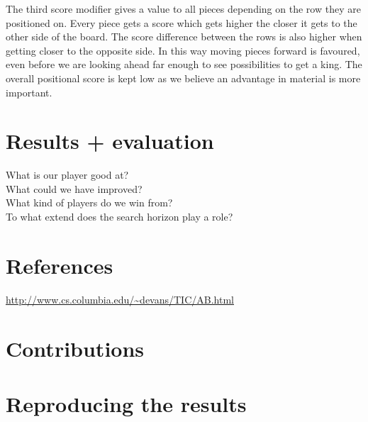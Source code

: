 \documentclass[11pt,a4paper]{article}
\begin{document}
The third score modifier gives a value to all pieces depending on the row they are positioned on. Every piece gets a score which gets higher the closer it gets to the other side of the board. The score difference between the rows is also higher when getting closer to the opposite side. In this way moving pieces forward is favoured, even before we are looking ahead far enough to see possibilities to get a king. The overall positional score is kept low as we believe an advantage in material is more important.

\section{Results + evaluation}
What is our player good at?\\
What could we have improved?\\
What kind of players do we win from?\\
To what extend does the search horizon play a role? %

\section{References}
\url{http://www.cs.columbia.edu/~devans/TIC/AB.html}
\section{Contributions}
\section{Reproducing the results}
\end{document}
